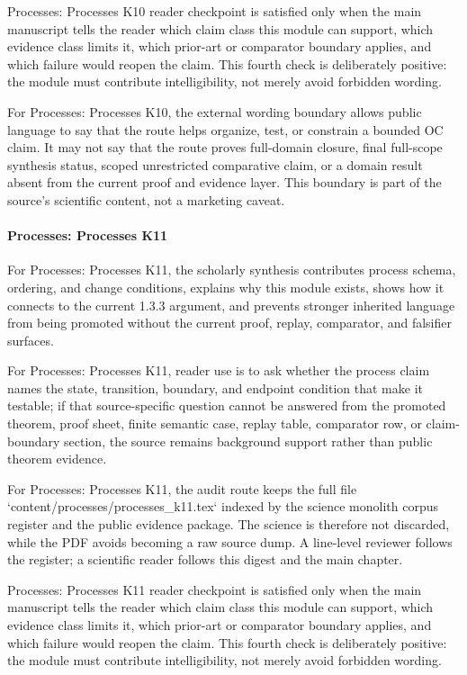 Processes: Processes K10 reader checkpoint is satisfied only when the main manuscript tells the reader which claim class this module can support, which evidence class limits it, which prior-art or comparator boundary applies, and which failure would reopen the claim. This fourth check is deliberately positive: the module must contribute intelligibility, not merely avoid forbidden wording.


For Processes: Processes K10, the external wording boundary allows public language to say that the route helps organize, test, or constrain a bounded OC claim. It may not say that the route proves full-domain closure, final full-scope synthesis status, scoped unrestricted comparative claim, or a domain result absent from the current proof and evidence layer. This boundary is part of the source's scientific content, not a marketing caveat.


\paragraph{Processes: Processes K11}

For Processes: Processes K11, the scholarly synthesis contributes process schema, ordering, and change conditions, explains why this module exists, shows how it connects to the current 1.3.3 argument, and prevents stronger inherited language from being promoted without the current proof, replay, comparator, and falsifier surfaces.


For Processes: Processes K11, reader use is to ask whether the process claim names the state, transition, boundary, and endpoint condition that make it testable; if that source-specific question cannot be answered from the promoted theorem, proof sheet, finite semantic case, replay table, comparator row, or claim-boundary section, the source remains background support rather than public theorem evidence.


For Processes: Processes K11, the audit route keeps the full file `content/processes/processes\_k11.tex` indexed by the science monolith corpus register and the public evidence package. The science is therefore not discarded, while the PDF avoids becoming a raw source dump. A line-level reviewer follows the register; a scientific reader follows this digest and the main chapter.


Processes: Processes K11 reader checkpoint is satisfied only when the main manuscript tells the reader which claim class this module can support, which evidence class limits it, which prior-art or comparator boundary applies, and which failure would reopen the claim. This fourth check is deliberately positive: the module must contribute intelligibility, not merely avoid forbidden wording.


